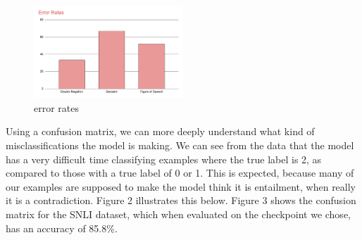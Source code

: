 \documentclass{article}
\begin{document}
\begin{figure}[!h]
  \centering
  \includegraphics[width=0.5\textwidth]{images/error_rates.png}
  \caption{error rates}
  \label{fig:a}
\end{figure}

Using a confusion matrix, we can more deeply understand what kind of misclassifications the model is making. We can see from the data that the model has a very 
difficult time classifying examples where the true label is 2, as compared to those with a true label of 0 or 1. This is expected, because many of our examples 
are supposed to make the model think it is entailment, when really it is a contradiction. Figure 2 illustrates this below. Figure 3 shows the confusion 
matrix for the SNLI dataset, which when evaluated on the checkpoint we chose, has an accuracy of 85.8\%. 
\end{document}
